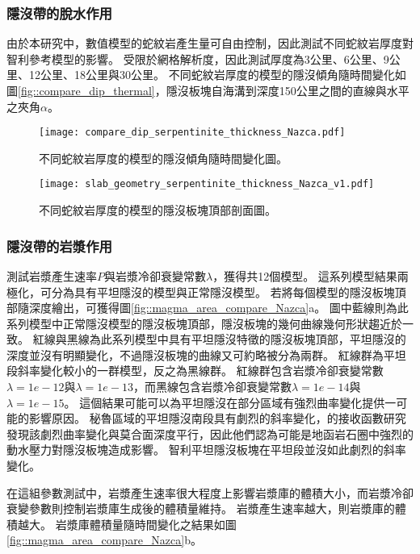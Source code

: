 \subsubsection{隱沒帶的脫水作用}
由於本研究中，數值模型的蛇紋岩產生量可自由控制，因此測試不同蛇紋岩厚度對智利參考模型的影響。
受限於網格解析度，因此測試厚度為3公里、6公里、9公里、12公里、18公里與30公里。
不同蛇紋岩厚度的模型的隱沒傾角隨時間變化如圖\ref{fig::compare_dip_thermal}，隱沒板塊自海溝到深度150公里之間的直線與水平之夾角$\alpha$。

\begin{figure*}[h]
    \centering
    \texttt{[image: compare\_dip\_serpentinite\_thickness\_Nazca.pdf]}
    \caption[不同蛇紋岩厚度的模型的隱沒傾角隨時間變化圖]{不同蛇紋岩厚度的模型的隱沒傾角隨時間變化圖。}
    \label{fig::slab_geometry_serpentinite_thickness_Nazca}
\end{figure*}

\begin{figure*}[h]
    \centering
    \texttt{[image: slab\_geometry\_serpentinite\_thickness\_Nazca\_v1.pdf]}
    \caption[不同蛇紋岩厚度的模型的隱沒板塊頂部剖面圖]{不同蛇紋岩厚度的模型的隱沒板塊頂部剖面圖。}
    \label{fig::slab_geometry_serpentinite_thickness_Nazca}
\end{figure*}



\subsubsection{隱沒帶的岩漿作用}
測試岩漿產生速率$P$與岩漿冷卻衰變常數$\lambda$，獲得共12個模型。
這系列模型結果兩極化，可分為具有平坦隱沒的模型與正常隱沒模型。
若將每個模型的隱沒板塊頂部隨深度繪出，可獲得圖\ref{fig::magma_area_compare_Nazca}a。
圖中藍線則為此系列模型中正常隱沒模型的隱沒板塊頂部，隱沒板塊的幾何曲線幾何形狀趨近於一致。
紅線與黑線為此系列模型中具有平坦隱沒特徵的隱沒板塊頂部，平坦隱沒的深度並沒有明顯變化，不過隱沒板塊的曲線又可約略被分為兩群。
紅線群為平坦段斜率變化較小的一群模型，反之為黑線群。
紅線群包含岩漿冷卻衰變常數$\lambda=1e-12$與$\lambda=1e-13$，而黑線包含岩漿冷卻衰變常數$\lambda=1e-14$與$\lambda=1e-15$。
這個結果可能可以為平坦隱沒在部分區域有強烈曲率變化提供一可能的影響原因。
秘魯區域的平坦隱沒南段具有劇烈的斜率變化，\citealp{Ma2015}的接收函數研究發現該劇烈曲率變化與莫合面深度平行，因此他們認為可能是地函岩石圈中強烈的動水壓力對隱沒板塊造成影響。
智利平坦隱沒板塊在平坦段並沒如此劇烈的斜率變化。

在這組參數測試中，岩漿產生速率很大程度上影響岩漿庫的體積大小，而岩漿冷卻衰變參數則控制岩漿庫生成後的體積量維持。
岩漿產生速率越大，則岩漿庫的體積越大。
岩漿庫體積量隨時間變化之結果如圖\ref{fig::magma_area_compare_Nazca}b。

